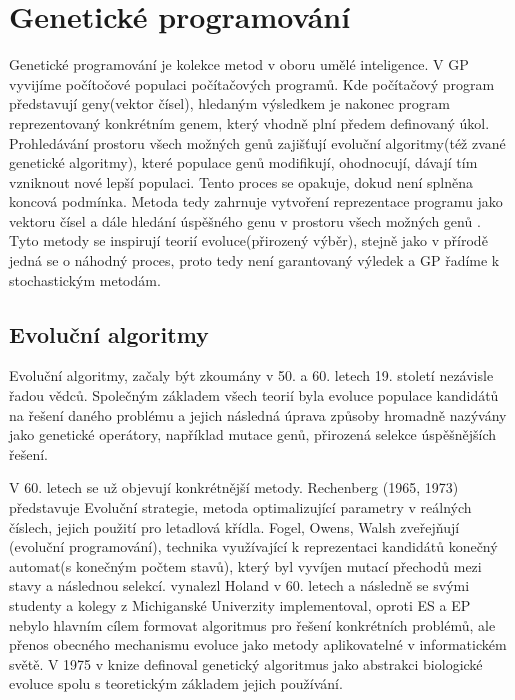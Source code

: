 \chapter{Genetické programování}
Genetické programování je kolekce metod v oboru umělé inteligence. V  GP vyvijíme počítočové populaci počítačových programů. Kde počítačový program představují geny(vektor čísel), hledaným výsledkem je nakonec program reprezentovaný konkrétním genem, který vhodně plní předem definovaný úkol. Prohledávání prostoru všech možných genů zajišťují evoluční algoritmy(též zvané genetické algoritmy), které populace genů modifikují, ohodnocují, dávají tím vzniknout nové lepší populaci. Tento proces se opakuje, dokud není splněna koncová podmínka. Metoda tedy zahrnuje vytvoření reprezentace programu jako vektoru čísel a dále hledání úspěšného genu v prostoru všech možných genů \citep{field}. Tyto metody se inspirují teorií evoluce(přirozený výběr), stejně jako v přírodě jedná se o náhodný proces, proto tedy není garantovaný výledek a GP řadíme k stochastickým metodám. 
\section{Evoluční algoritmy}
Evoluční algoritmy, začaly být zkoumány v 50. a 60. letech 19. století nezávisle řadou vědců. Společným základem všech teorií byla evoluce populace kandidátů na řešení daného problému a jejich následná úprava způsoby hromadně nazývány jako genetické operátory, například mutace genů, přirozená selekce úspěšnějších řešení. \par 
V 60. letech se už objevují konkrétnější metody. Rechenberg (1965, 1973) představuje Evoluční strategie, metoda optimalizující parametry v reálných číslech, jejich použití pro letadlová křídla. Fogel, Owens, Walsh zveřejňují \cite{evolutionary programming}(evoluční programování), technika využívající k reprezentaci kandidátů konečný automat(s konečným počtem stavů), který byl vyvíjen mutací přechodů mezi stavy a následnou selekcí. \cite{Genetické algoritmy} vynalezl Holand v 60. letech a následně se svými studenty a kolegy z Michiganské Univerzity implementoval, oproti ES a EP nebylo hlavním cílem formovat algoritmus pro řešení konkrétních problémů, ale přenos obecného mechanismu evoluce jako metody aplikovatelné v informatickém světě. V 1975 v knize \cite{Adaptation in Natural and  Artificial Systems} \citep{HolandBook} definoval genetický algoritmus jako abstrakci biologické evoluce spolu s teoretickým základem jejich používání.
